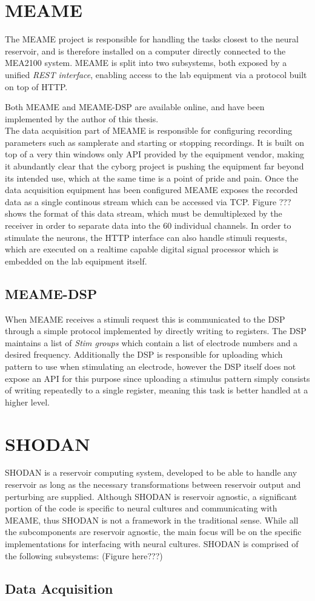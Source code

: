 \section{MEAME}
The MEAME project is responsible for handling the tasks closest to the neural
reservoir, and is therefore installed on a computer directly connected to the
MEA2100 system.
MEAME is split into two subsystems, both exposed by a unified \emph{REST
  interface}, enabling access to the lab equipment via a protocol built on top
of HTTP.

Both MEAME and MEAME-DSP are available online, and have been implemented by the
author of this thesis.\\

The data acquisition part of MEAME is responsible for configuring recording
parameters such as samplerate and starting or stopping recordings.
It is built on top of a very thin windows only API provided by the equipment vendor, making
it abundantly clear that the cyborg project is pushing the equipment far beyond
its intended use, which at the same time is a point of pride and pain.
Once the data acquisition equipment has been configured MEAME exposes the
recorded data as a single continous stream which can be accessed via TCP.
Figure ??? shows the format of this data stream, which must be demultiplexed by
the receiver in order to separate data into the 60 individual channels.
In order to stimulate the neurons, the HTTP interface can also handle stimuli
requests, which are executed on a realtime capable digital signal processor
which is embedded on the lab equipment itself.
\subsection{MEAME-DSP}
When MEAME receives a stimuli request this is communicated to the DSP through a
simple protocol implemented by directly writing to registers.
The DSP maintains a list of \emph{Stim groups} which contain a list of electrode
numbers and a desired frequency.
Additionally the DSP is responsible for uploading which pattern to use when
stimulating an electrode, however the DSP itself does not expose an API for this
purpose since uploading a stimulus pattern simply consists of writing repeatedly
to a single register, meaning this task is better handled at a higher level.

\section{SHODAN}
SHODAN is a reservoir computing system, developed to be able to handle any
reservoir as long as the necessary transformations between reservoir output and
perturbing are supplied.
Although SHODAN is reservoir agnostic, a significant portion of the code is
specific to neural cultures and communicating with MEAME, thus SHODAN is not a
framework in the traditional sense.
While all the subcomponents are reservoir agnostic, the main focus will be on
the specific implementations for interfacing with neural cultures.
SHODAN is comprised of the following subsystems:
(Figure here???)
\subsection{Data Acquisition}
\cleardoublepage


